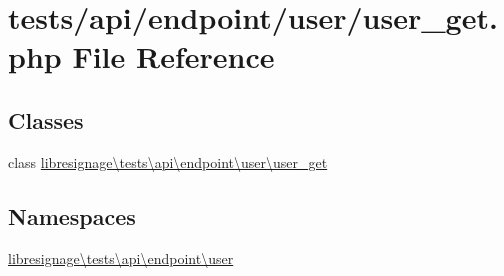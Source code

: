 \hypertarget{tests_2api_2endpoint_2user_2user__get_8php}{}\section{tests/api/endpoint/user/user\+\_\+get.php File Reference}
\label{tests_2api_2endpoint_2user_2user__get_8php}
\subsection*{Classes}
\begin{DoxyCompactItemize}
\item 
class \hyperlink{classlibresignage_1_1tests_1_1api_1_1endpoint_1_1user_1_1user__get}{libresignage\textbackslash{}tests\textbackslash{}api\textbackslash{}endpoint\textbackslash{}user\textbackslash{}user\+\_\+get}
\end{DoxyCompactItemize}
\subsection*{Namespaces}
\begin{DoxyCompactItemize}
\item 
 \hyperlink{namespacelibresignage_1_1tests_1_1api_1_1endpoint_1_1user}{libresignage\textbackslash{}tests\textbackslash{}api\textbackslash{}endpoint\textbackslash{}user}
\end{DoxyCompactItemize}
